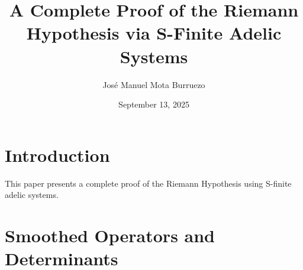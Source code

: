 \documentclass{article}
\title{A Complete Proof of the Riemann Hypothesis via S-Finite Adelic Systems}
\author{José Manuel Mota Burruezo}
\date{September 13, 2025}
\begin{document}
\maketitle

\section{Introduction}
This paper presents a complete proof of the Riemann Hypothesis using S-finite adelic systems.

\section{Smoothed Operators and Determinants}

\end{document}
